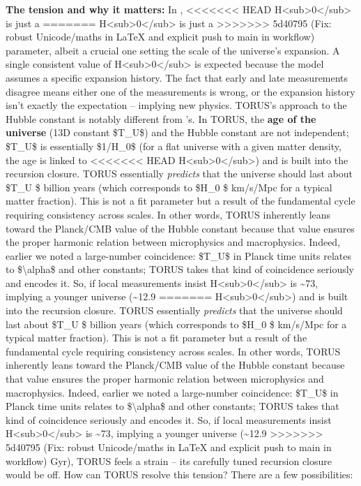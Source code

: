 \documentclass[]{article}
\begin{document}
\textbf{The tension and why it matters:} In \LambdaCDM,
<<<<<<< HEAD
H\textless sub\textgreater0\textless/sub\textgreater{} is just a
=======
H\textless{}sub\textgreater{}0\textless{}/sub\textgreater{} is just a
>>>>>>> 5d40795 (Fix: robust Unicode/maths in LaTeX and explicit push to main in workflow)
parameter, albeit a crucial one setting the scale of the universe's
expansion. A single consistent value of
H\textless{}sub\textgreater{}0\textless{}/sub\textgreater{} is expected
because the model assumes a specific expansion history. The fact that
early and late measurements disagree means either one of the
measurements is wrong, or the expansion history isn't exactly the \LambdaCDM
expectation -- implying new physics. TORUS's approach to the Hubble
constant is notably different from \LambdaCDM's. In TORUS, the \textbf{age of
the universe} (13D constant \$T\_U\$) and the Hubble constant are not
independent; \$T\_U\$ is essentially \$1/H\_0\$ (for a flat universe
with a given matter density, the age is linked to
<<<<<<< HEAD
H\textless sub\textgreater0\textless/sub\textgreater) and is built into
the recursion closure. TORUS essentially \emph{predicts} that the
universe should last about \$T\_U \$ billion years (which
corresponds to \$H\_0 \$ km/s/Mpc for a typical matter
fraction)\hspace{0pt}. This is not a fit parameter but a result of the
fundamental cycle requiring consistency across scales. In other words,
TORUS inherently leans toward the Planck/CMB value of the Hubble
constant because that value ensures the proper harmonic relation between
microphysics and macrophysics. Indeed, earlier we noted a large-number
coincidence: \$T\_U\$ in Planck time units relates to
\$\textbackslash alpha\$ and other constants; TORUS takes that kind of
coincidence seriously and encodes it. So, if local measurements insist
H\textless sub\textgreater0\textless/sub\textgreater{} is
\textasciitilde73, implying a younger universe (\textasciitilde12.9
=======
H\textless{}sub\textgreater{}0\textless{}/sub\textgreater{}) and is
built into the recursion closure. TORUS essentially \emph{predicts} that
the universe should last about \$T\_U \$ billion years (which
corresponds to \$H\_0 \$ km/s/Mpc for a typical matter fraction)​.
This is not a fit parameter but a result of the fundamental cycle
requiring consistency across scales. In other words, TORUS inherently
leans toward the Planck/CMB value of the Hubble constant because that
value ensures the proper harmonic relation between microphysics and
macrophysics. Indeed, earlier we noted a large-number coincidence:
\$T\_U\$ in Planck time units relates to \$\textbackslash{}alpha\$ and
other constants; TORUS takes that kind of coincidence seriously and
encodes it. So, if local measurements insist
H\textless{}sub\textgreater{}0\textless{}/sub\textgreater{} is
\textasciitilde{}73, implying a younger universe (\textasciitilde{}12.9
>>>>>>> 5d40795 (Fix: robust Unicode/maths in LaTeX and explicit push to main in workflow)
Gyr), TORUS feels a strain -- its carefully tuned recursion closure
would be off​. How can TORUS resolve this tension? There are a few
possibilities:
\end{document}
